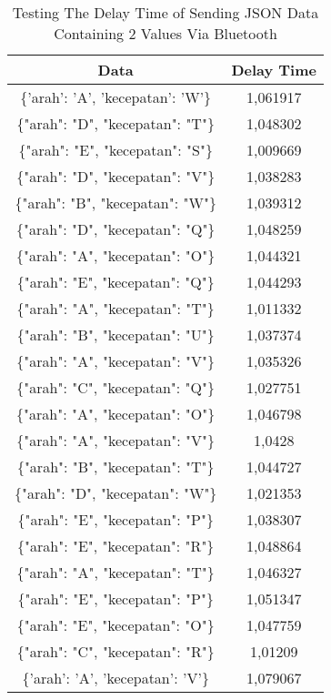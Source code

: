 \begin{table}[!ht]
  \centering
  \caption{Testing The Delay Time of Sending JSON Data Containing 2 Values Via Bluetooth}
  \label{tbl:delayBluetoothJSON2}
  \begin{tabular}{|c|c|}
  \hline
  Data                              & Delay Time  \\ \hline
  \{'arah': 'A', 'kecepatan': 'W'\} & 1,061917    \\ \hline
  \{"arah": "D", "kecepatan": "T"\} & 1,048302    \\ \hline
  \{"arah": "E", "kecepatan": "S"\} & 1,009669    \\ \hline
  \{"arah": "D", "kecepatan": "V"\} & 1,038283    \\ \hline
  \{"arah": "B", "kecepatan": "W"\} & 1,039312    \\ \hline
  \{"arah": "D", "kecepatan": "Q"\} & 1,048259    \\ \hline
  \{"arah": "A", "kecepatan": "O"\} & 1,044321    \\ \hline
  \{"arah": "E", "kecepatan": "Q"\} & 1,044293    \\ \hline
  \{"arah": "A", "kecepatan": "T"\} & 1,011332    \\ \hline
  \{"arah": "B", "kecepatan": "U"\} & 1,037374    \\ \hline
  \{"arah": "A", "kecepatan": "V"\} & 1,035326    \\ \hline
  \{"arah": "C", "kecepatan": "Q"\} & 1,027751    \\ \hline
  \{"arah": "A", "kecepatan": "O"\} & 1,046798    \\ \hline
  \{"arah": "A", "kecepatan": "V"\} & 1,0428      \\ \hline
  \{"arah": "B", "kecepatan": "T"\} & 1,044727    \\ \hline
  \{"arah": "D", "kecepatan": "W"\} & 1,021353    \\ \hline
  \{"arah": "E", "kecepatan": "P"\} & 1,038307    \\ \hline
  \{"arah": "E", "kecepatan": "R"\} & 1,048864    \\ \hline
  \{"arah": "A", "kecepatan": "T"\} & 1,046327    \\ \hline
  \{"arah": "E", "kecepatan": "P"\} & 1,051347    \\ \hline
  \{"arah": "E", "kecepatan": "O"\} & 1,047759    \\ \hline
  \{"arah": "C", "kecepatan": "R"\} & 1,01209     \\ \hline
  \{'arah': 'A', 'kecepatan': 'V'\} & 1,079067    \\ \hline

\end{tabular}
\end{table}
